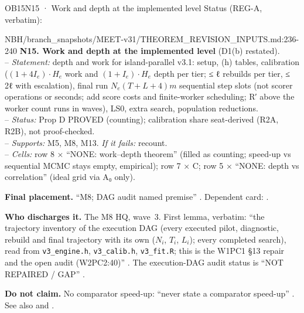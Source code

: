 \begin{card}{OB15}{N15 · Work and depth at the implemented level}
Status (REG-A, verbatim):  
\begin{stmt}{NBH/branch_snapshots/MEET-v31/THEOREM_REVISION_INPUTS.md:236-240}
\textbf{N15. Work and depth at the implemented level} (D1(b) restated).\\
– \emph{Statement:} depth and work for island-parallel v3.1: setup, (h) tables, calibration ($(1+4I_e)\cdot H_e$ work and $(1+I_e)\cdot H_e$ depth per tier; ≤ ℓ rebuilds per tier, ≤ 2ℓ with escalation), final run $N_e(T+L+4)m$ sequential step slots (not scorer operations or seconds; add score costs and finite-worker scheduling; R′ above the worker count runs in waves), LS0, extra search, population reductions.\\
– \emph{Status:} Prop D PROVED (counting); calibration share seat-derived (R2A, R2B), not proof-checked.\\
– \emph{Supports:} M5, M8, M13. \emph{If it fails:} recount.\\
– \emph{Cells:} row 8 × ``NONE: work–depth theorem'' (filled as counting; speed-up vs sequential MCMC stays empty, empirical); row 7 × C; row 5 × ``NONE: depth vs correlation'' (ideal grid via A₀ only).
\end{stmt}
\textbf{Final placement.} ``M8; DAG audit named premise'' . Dependent card: .

\textbf{Who discharges it.} The M8 HQ, wave~3. First lemma, verbatim: ``the trajectory inventory of the execution DAG (every executed pilot, diagnostic, rebuild and final trajectory with its own ($N_i$, $T_i$, $L_i$); every completed search), read from \texttt{v3\_engine.h}, \texttt{v3\_calib.h}, \texttt{v3\_fit.R}; this is the W1PC1 §13 repair and the open audit (W2PC2:40)'' . The execution-DAG audit status is ``NOT REPAIRED / GAP'' .

\textbf{Do not claim.} No comparator speed-up: ``never state a comparator speed-up'' . See also  and .
\end{card}


